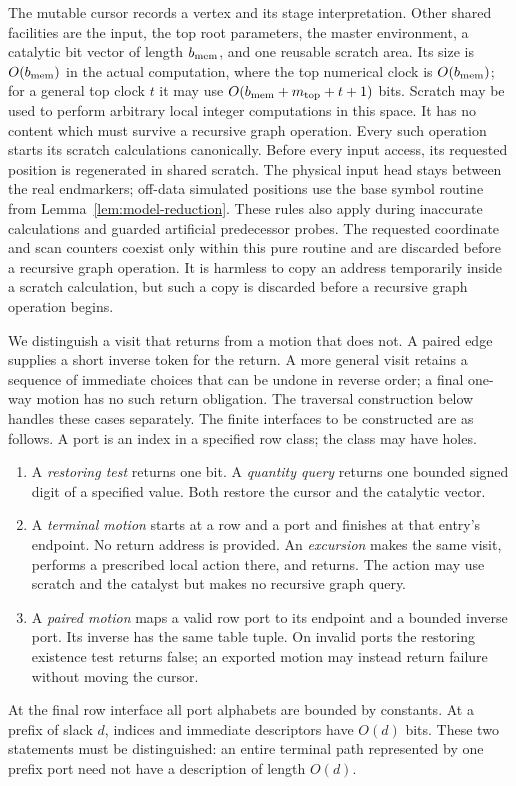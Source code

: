 \documentclass[11pt]{article}
\numberwithin{equation}{section}
\theoremstyle{definition}
\theoremstyle{remark}
\begin{document}
The mutable cursor records a vertex and its stage interpretation.  Other shared facilities are the input, the top root parameters, the master
environment, a catalytic bit vector of length ${b_{\rm mem}}$, and one reusable
scratch area.  Its size is $O({b_{\rm mem}})$ in the actual computation, where the
top numerical clock is $O({b_{\rm mem}})$; for a general top clock $t$ it may use
$O({b_{\rm mem}}+{m}_{\mathrm{top}}+t+1)$ bits.  Scratch may be used to perform arbitrary local integer
computations in this space.  It has no content which must survive a
recursive graph operation.  Every such operation starts its scratch
calculations canonically. Before every input access, its requested
position is regenerated in shared scratch. The physical
input head stays between the real endmarkers; off-data simulated
positions use the base symbol routine from
Lemma~\ref{lem:model-reduction}. These rules also apply during inaccurate
calculations and guarded artificial predecessor probes. The requested
coordinate and scan counters coexist only within this pure routine and
are discarded before a recursive graph operation. It is harmless to
copy an address temporarily
inside a scratch calculation, but such a copy is discarded before a
recursive graph operation begins.

We distinguish a visit that returns from a motion that does not. A paired edge supplies a short inverse token for the return. A more general visit retains a sequence of immediate choices that can be undone in reverse order; a final one-way motion has no such return obligation. The traversal construction below handles these cases separately. The finite interfaces to be constructed are as follows.  A port is an
index in a specified row class; the class may have holes.
\begin{enumerate}
\item A \emph{restoring test} returns one bit.  A \emph{quantity query}
  returns one bounded signed digit of a specified value.  Both restore
  the cursor and the catalytic vector.
\item A \emph{terminal motion} starts at a row and a port and finishes at
  that entry's endpoint.  No return address is provided.  An
  \emph{excursion} makes the same visit, performs a prescribed local
  action there, and returns.  The action may use scratch and the catalyst
  but makes no recursive graph query.
\item A \emph{paired motion} maps a valid row port to its endpoint and a
  bounded inverse port.  Its inverse has the same table tuple.  On
  invalid ports the restoring existence test returns false; an exported
  motion may instead return failure without moving the cursor.
\end{enumerate}
At the final row interface all port alphabets are bounded by constants.
At a prefix of slack $d$, indices and immediate descriptors have $O(d)$
bits.  These two statements must be distinguished: an entire terminal
path represented by one prefix port need not have a description of
length $O(d)$.
\end{document}
